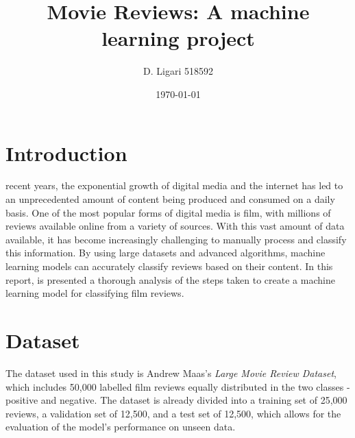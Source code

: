 \documentclass[eng]{class}
\title{Movie Reviews: A machine learning project}
\author[1]{D. Ligari 518592}
\affil[1]{University of Pavia, Department of Computer Engineering (Data Science), Pavia, Italy}
\date{\today}
\begin{document}
\maketitle
\thispagestyle{fancy}
\section{Introduction}
recent years, the exponential growth of digital media and the internet has led to an unprecedented amount of content being produced and consumed on a daily basis.
One of the most popular forms of digital media is film, with millions of reviews available online from a variety of sources. With this vast amount of data available,
it has become increasingly challenging to manually process and classify this information.
By using large datasets and advanced algorithms, machine learning models can accurately classify reviews based on their content.
In this report, is presented a thorough analysis of the steps taken to create a machine learning model for classifying film reviews.
\section{Dataset}
The dataset used in this study is Andrew Maas's \textit{Large Movie Review Dataset},
which includes 50,000 labelled film reviews equally distributed in the two classes - positive and negative.
The dataset is already divided into a training set of 25,000 reviews, a validation set of 12,500, and a test set of 12,500,
which allows for the evaluation of the model's performance on unseen data.
\end{document}
